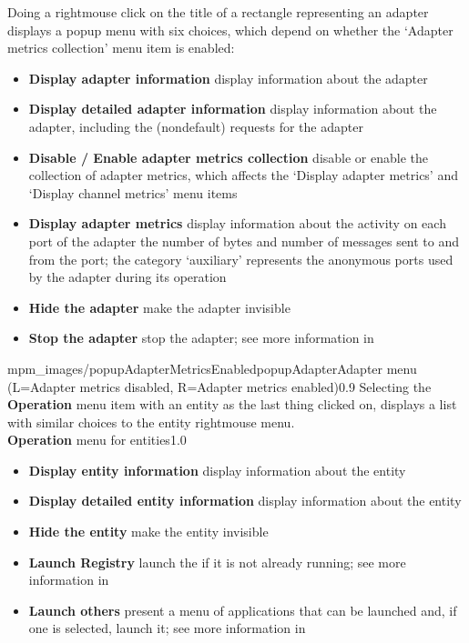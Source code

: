 \condPage{}
Doing a right\longDash{}mouse click on the title of a rectangle representing an adapter
displays a popup menu with six choices, which depend on whether the `Adapter metrics
collection' menu item is enabled:
\begin{itemize}
\item\textbf{Display adapter information} display information about the adapter
\item\exSp\textbf{Display detailed adapter information} display information about the
adapter, including the (non\longDash{}default) requests for the adapter
\item\exSp\textbf{Disable / Enable adapter metrics collection} disable or enable the
collection of adapter metrics, which affects the `Display adapter metrics' and `Display
channel metrics' menu items
\item\exSp\textbf{Display adapter metrics} display information about the activity on each
port of the adapter \longDash{} the number of bytes and number of messages sent to and
from the port; the category `auxiliary' represents the anonymous ports used by the adapter
during its operation
\item\exSp\textbf{Hide the adapter} make the adapter invisible
\item\exSp\textbf{Stop the adapter} stop the adapter; see more information in
\end{itemize}
%
{mpm_images/popupAdapterMetricsEnabled}{popupAdapter}{Adapter menu (L=Adapter metrics
disabled, R=Adapter metrics enabled)}{0.9}
\condPage{}
Selecting the \textbf{Operation} menu item with an entity as the last thing clicked on,
displays a list with similar choices to the entity right\longDash{}mouse menu.\\
%
{\textbf{Operation} menu for entities}{1.0}
\begin{itemize}
\item\textbf{Display entity information} display information about the entity
\item\exSp\textbf{Display detailed entity information} display information about the
entity
\item\exSp\textbf{Hide the entity} make the entity invisible
\item\exSp\textbf{Launch Registry} launch the \emph{\RS} if it is not already running; see
more information in\\
\item\exSp\textbf{Launch others \textellipsis} present a menu of applications that can be
launched and, if one is selected, launch it; see more information in
\end{itemize}
